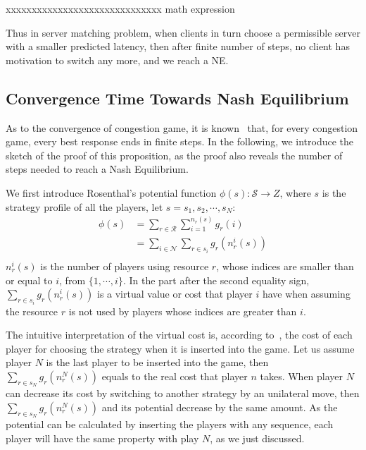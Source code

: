 xxxxxxxxxxxxxxxxxxxxxxxxxxxxxx   math expression

Thus in server matching problem, when clients in turn choose a permissible server with a smaller predicted latency, then after finite number of steps, no client has motivation to switch any more, and we reach a NE.








\subsection{Convergence Time Towards Nash Equilibrium}
As to the convergence of congestion game, it is known~\cite{Voecking06congestiongames} that, for every congestion game, every best response ends in finite steps.
In the following, we introduce the sketch of the proof of this proposition, as the proof also reveals the number of steps needed to reach a Nash Equilibrium.

We first introduce Rosenthal's potential function $\phi(s):\mathcal{S}\rightarrow Z$, where $s$ is the strategy profile of all the players, let $s = s_1, s_2,\cdots, s_N$:
\begin{equation}
\label{4}
\begin{split}
\phi(s) 
& =\sum\limits^{}_{r\in \mathcal{R}} \sum\limits^{n_r(s)}_{i=1} g_r(i)\\
& =\sum\limits_{i\in \mathcal{N}} \sum\limits^{}_{r\in s_i} g_r(n_r^i(s))\\
\end{split}
\end{equation}
$n_r^i(s)$ is the number of players using resource $r$, whose indices are smaller than or equal to $i$, \ie from $\{1,\cdots,i\}$. 
In the part after the second equality sign, $\sum\limits^{}_{r\in s_i} g_r(n_r^i(s))$ is a virtual value or cost that player $i$ have when assuming the resource $r$ is not used by players whose indices are greater than $i$.

The intuitive interpretation of the virtual cost is, according to~\cite{Voecking06congestiongames}, the cost of each player for choosing the strategy when it is inserted into the game.
Let us assume player $N$ is the last player to be inserted into the game, then $\sum\limits^{}_{r\in s_N} g_r(n_r^N(s))$ equals to the real cost that player $n$ takes.
When player $N$ can decrease its cost by switching to another strategy by an unilateral move, then $\sum\limits^{}_{r\in s_N} g_r(n_r^N(s))$ and its potential decrease by the same amount.
As the potential can be calculated by inserting the players with any sequence, each player will have the same property with play $N$, as we just discussed.


